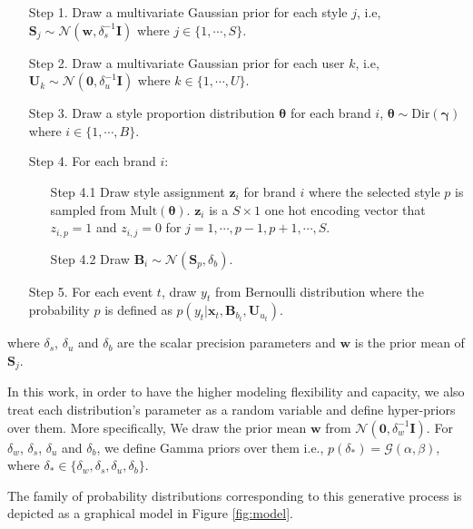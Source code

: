 \begin{enumerate}
\item[Step 1.] Draw a multivariate Gaussian prior for each style $j$, i.e, $\mathbf{S}_j \sim \mathcal{N}(\mathbf{w}, \delta_s^{-1}\mathbf{I})$ where $j \in \{1, \cdots, S\}$.

\item[Step 2.] Draw a multivariate Gaussian prior for each user $k$, i.e, $\mathbf{U}_k \sim \mathcal{N}(\mathbf{0}, \delta_u^{-1}\mathbf{I})$ where $k \in \{1, \cdots, U\}$.

\item[Step 3.] Draw a style proportion distribution $\boldsymbol{\theta}$ for each brand $i$, $\boldsymbol{\theta} \sim \mbox{Dir}(\boldsymbol{\gamma})$  where $i \in \{1, \cdots, B\}$.

\item[Step 4.] For each brand $i$:
	\begin{enumerate}
		\item[Step 4.1] Draw style assignment $\mathbf{z}_i$ for brand $i$ where the selected style $p$ is sampled from $\mbox{Mult}(\boldsymbol{\theta})$. $\mathbf{z}_i$ is a $S\times1$ one hot encoding vector that $z_{i,p} = 1$ and $z_{i,j} = 0$ for $j = 1, \cdots, p-1, p+1, \cdots, S$.
		\item[Step 4.2] Draw $\mathbf{B}_i \sim \mathcal{N}(\mathbf{S}_{p}, \delta_b)$.
	\end{enumerate}

\item[Step 5.] For each event $t$, draw $y_t$ from Bernoulli distribution where the probability $p$ is defined as $p(y_t|\mathbf{x}_t, \mathbf{B}_{b_t}, \mathbf{U}_{u_t})$.
\end{enumerate}

\noindent where $\delta_s$, $\delta_u$ and $\delta_b$ are the scalar precision parameters and $\mathbf{w}$ is the prior mean of $\mathbf{S}_j$. 

In this work, in order to have the higher modeling flexibility and capacity, we also treat each distribution's parameter as a random variable and define hyper-priors over them. More specifically, We draw the prior mean $\mathbf{w}$ from $\mathcal{N}(\mathbf{0}, \delta_w^{-1}\mathbf{I})$. For $\delta_w$, $\delta_s$, $\delta_u$ and $\delta_b$, we define Gamma priors over them i.e.,  $p(\delta_*) = \mathcal{G}(\alpha, \beta)$, where $\delta_* \in \{ \delta_w, \delta_s, \delta_u, \delta_b \}$. 

The family of probability distributions corresponding to this generative process is depicted as a graphical model in Figure \ref{fig:model}.

